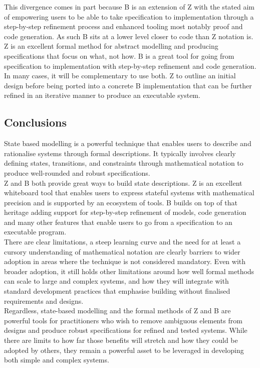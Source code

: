 \documentclass{article}
\begin{document}
\hspace{-0.68cm}This divergence comes in part because B is an extension of Z with the stated aim of empowering users to be able to take specification to implementation through a step-by-step refinement process and enhanced tooling most notably proof and code generation. As such B sits at a lower level closer to code than Z notation is. \\
\newline 
\hspace{-0.68cm} Z is an excellent formal method for abstract modelling and producing specifications that focus on what, not how. B is a great tool for going from specification to implementation with step-by-step refinement and code generation. In many cases, it will be complementary to use both. Z to outline an initial design before being ported into a concrete B implementation that can be further refined in an iterative manner to produce an executable system.
\subsection*{Conclusions}

State based modelling is a powerful technique that enables users to describe and rationalise systems through formal descriptions. It typically involves clearly defining states, transitions, and constraints through mathematical notation to produce well-rounded and robust specifications. \\
\newline
Z and B both provide great ways to build state descriptions. Z is an excellent whiteboard tool that enables users to express stateful systems with mathematical precision and is supported by an ecosystem of tools. B builds on top of that heritage adding support for step-by-step refinement of models, code generation and many other features that enable users to go from a specification to an executable program. \\
\newline
There are clear limitations, a steep learning curve and the need for at least a cursory understanding of mathematical notation are clearly barriers to wider adoption in areas where the technique is not considered mandatory. Even with broader adoption, it still holds other limitations around how well formal methods can scale to large and complex systems, and how they will integrate with standard development practices that emphasise building without finalised requirements and designs. \\
\newline
Regardless, state-based modelling and the formal methods of Z and B are powerful tools for practitioners who wish to remove ambiguous elements from designs and produce robust specifications for refined and tested systems. While there are limits to how far those benefits will stretch and how they could be adopted by others, they remain a powerful asset to be leveraged in developing both simple and complex systems. 
\pagebreak
\end{document}
